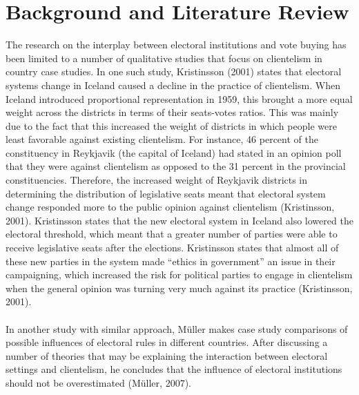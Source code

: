 \documentclass{article}
\begin{document}
\section{Background and Literature Review}
The research on the interplay between electoral institutions and vote buying has been limited to a number of qualitative studies that focus on clientelism in country case studies. In one such study, Kristinsson (2001) states that electoral systems change in Iceland caused a decline in the practice of clientelism. When Iceland introduced proportional representation in 1959, this brought a more equal weight across the districts in terms of their seats-votes ratios. This was mainly due to the fact that this increased the weight of districts in which people were least favorable against existing clientelism. For instance, 46 percent of the constituency in Reykjavik (the capital of Iceland) had stated in an opinion poll that they were against clientelism as opposed to the 31 percent in the provincial constituencies. Therefore, the increased weight of Reykjavik districts in determining the distribution of legislative seats meant that electoral system change responded more to the public opinion against clientelism (Kristinsson, 2001). Kristinsson states that the new electoral system in Iceland also lowered the electoral threshold, which meant that a greater number of parties were able to receive legislative seats after the elections. Kristinsson states that almost all of these new parties in the system made ``ethics in government'' an issue in their campaigning, which increased the risk for political parties to engage in clientelism when the general opinion was turning very much against its practice (Kristinsson, 2001).\\
\\
In another study with similar approach, M\"uller makes case study comparisons of possible influences of electoral rules in different countries. After discussing a number of theories that may be explaining the interaction between electoral settings and clientelism, he concludes that the influence of electoral institutions should not be overestimated (M\"uller, 2007).\\
\\
\end{document}
